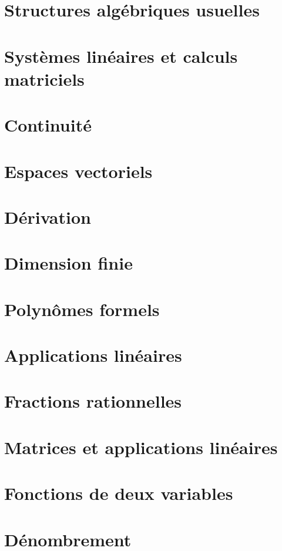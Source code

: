 \documentclass[a4paper]{report}
\newcommand{\chap}[2][0]{
    \setcounter{chapter}{#1 - 1}
    \chapter{#2}
    \renewcommand*\parttitle{#2}
}
\begin{document}
	\chap[12]{Structures algébriques usuelles}
	\renewcommand{\cwd}{../chap12}
	
	
	
	

	\chap[13]{Systèmes linéaires et calculs matriciels}
	\renewcommand{\cwd}{../chap13}
	

	\chap[14]{Continuité}
	\renewcommand{\cwd}{../chap14}
	
	
	
	

	\chap[15]{Espaces vectoriels}
	\renewcommand{\cwd}{../chap15}
	
	
	

	\chap[16]{Dérivation}
	\renewcommand{\cwd}{../chap16}
	
	
	
	

	\chap[17]{Dimension finie}
	\renewcommand{\cwd}{../chap17}
	

	\chap[18]{Polynômes formels}
	\renewcommand{\cwd}{../chap18}
	
	
	
	

	\chap[19]{Applications linéaires}
	\renewcommand{\cwd}{../chap19}
	
	
	
	
	

	\chap[20]{Fractions rationnelles}
	\renewcommand{\cwd}{../chap20}
	
	

	\chap[21]{Matrices et applications linéaires}
	\renewcommand{\cwd}{../chap21}
	
	
	
	
	
	

	\chap[22]{Fonctions de deux variables}
	\renewcommand{\cwd}{../chap22}
	
	
	

	\chap[23]{Dénombrement}
	\renewcommand{\cwd}{../chap23}
	
\end{document}
